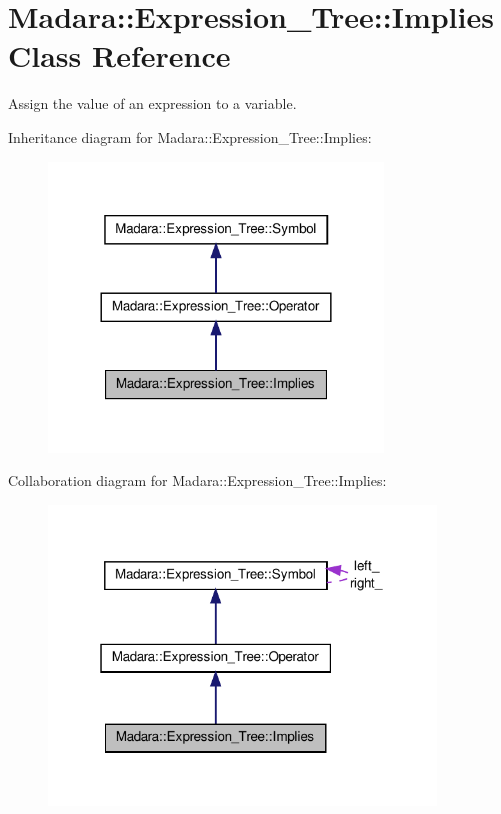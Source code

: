 \hypertarget{classMadara_1_1Expression__Tree_1_1Implies}{
\section{Madara::Expression\_\-Tree::Implies Class Reference}
\label{d2/dda/classMadara_1_1Expression__Tree_1_1Implies}
}


Assign the value of an expression to a variable.  




Inheritance diagram for Madara::Expression\_\-Tree::Implies:
\nopagebreak
\begin{figure}[H]
\begin{center}
\leavevmode
\includegraphics[width=252pt]{d7/d80/classMadara_1_1Expression__Tree_1_1Implies__inherit__graph}
\end{center}
\end{figure}


Collaboration diagram for Madara::Expression\_\-Tree::Implies:
\nopagebreak
\begin{figure}[H]
\begin{center}
\leavevmode
\includegraphics[width=292pt]{d8/d12/classMadara_1_1Expression__Tree_1_1Implies__coll__graph}
\end{center}
\end{figure}
